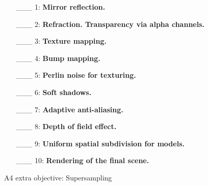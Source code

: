 \documentclass[12pt]{article}
\begin{document}
\begin{enumerate}
     \item[\_\_\_ 1:]  {\bf Mirror reflection. } 

     \item[\_\_\_ 2:]  {\bf Refraction. Transparency via alpha channels. } 

     \item[\_\_\_ 3:]  {\bf Texture mapping. } 

     \item[\_\_\_ 4:]  {\bf Bump mapping. } 

     \item[\_\_\_ 5:]  {\bf Perlin noise for texturing. } 

     \item[\_\_\_ 6:]  {\bf Soft shadows. } 

     \item[\_\_\_ 7:]  {\bf Adaptive anti-aliasing. } 

     \item[\_\_\_ 8:]  {\bf Depth of field effect. }

     \item[\_\_\_ 9:]  {\bf Uniform spatial subdivision for models. }

     \item[\_\_\_ 10:]  {\bf Rendering of the final scene. }
\end{enumerate}

A4 extra objective: Supersampling
\end{document}
